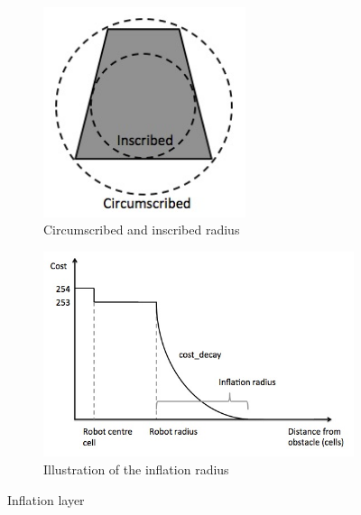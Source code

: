 \documentclass[capstone_report.tex]{subfiles}
\begin{document}
\begin{figure}[H]
    \centering
    \begin{subfigure}[b]{0.5\textwidth}
        \centering
        \includegraphics[width=0.65\textwidth]{./imgs/circumscribed.jpg}
        \caption{Circumscribed and inscribed radius}
        \label{fig:circumscribed}
    \end{subfigure}%
    \begin{subfigure}[b]{0.5\textwidth}
        \centering
        \includegraphics[width=1.1\textwidth]{./imgs/inflation_radius.jpg}
        \caption{Illustration of the inflation radius}
        \label{fig:inflation_radius}
    \end{subfigure}
    \caption{Inflation layer\label{fig:inflation_layer}}
\end{figure}
\end{document}
